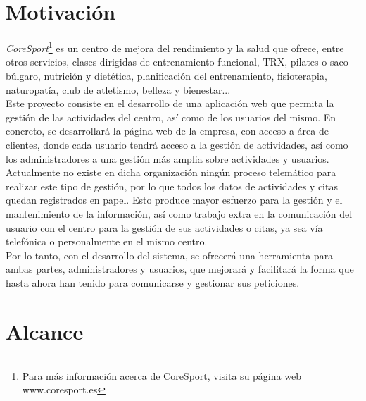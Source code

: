 


\section{Motivación}

\textsl{CoreSport}\footnote{Para más información acerca de CoreSport, visita su página web www.coresport.es} es un centro de mejora del rendimiento y la salud que ofrece, entre otros servicios, clases dirigidas de entrenamiento funcional, TRX, pilates o saco búlgaro, nutrición y dietética, planificación del entrenamiento, fisioterapia, naturopatía, club de atletismo, belleza y bienestar... 
\\
Este proyecto consiste en el desarrollo de una aplicación web que permita la gestión de las actividades del centro, así como de los usuarios del mismo. En concreto, se desarrollará la página web de la empresa, con acceso a área de clientes, donde cada usuario tendrá acceso a la gestión de actividades, así como los administradores a una gestión más amplia sobre actividades y usuarios. 
\\

Actualmente no existe en dicha organización ningún proceso telemático para realizar este tipo de gestión, por lo que todos los datos de actividades y citas quedan registrados en papel. Esto produce mayor esfuerzo para la gestión y el mantenimiento de la información, así como trabajo extra en la comunicación del usuario con el centro para la gestión de sus actividades o citas, ya sea vía telefónica o personalmente en el mismo centro.
\\

Por lo tanto, con el desarrollo del sistema, se ofrecerá una herramienta para ambas partes, administradores y usuarios, que mejorará y facilitará la forma que hasta ahora han tenido para comunicarse y gestionar sus peticiones.


\section{Alcance} 

